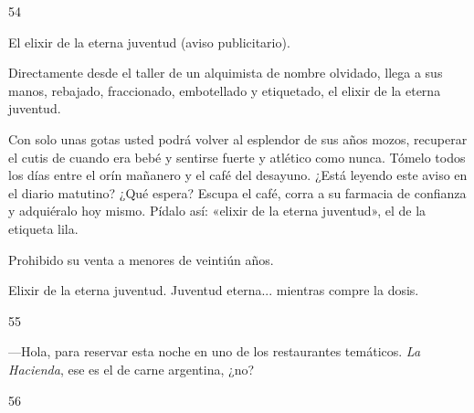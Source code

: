 \documentclass[12pt,twoside,openright,a5paper]{book}
\begin{document}
\vspace{0.5cm}

\hrulefill \hspace{0.1cm}\decofourleft\hspace{0.2cm} 54 \hspace{0.2cm}\decofourright \hspace{0.1cm}\hrulefill

\nopagebreak

\vspace{0.5cm}

\nopagebreak

El elixir de la eterna juventud (aviso publicitario).

Directamente desde el taller de un alquimista de nombre olvidado, llega a
sus manos, rebajado, fraccionado, embotellado y etiquetado, el elixir de
la eterna juventud.

Con solo unas gotas usted podrá volver al esplendor de sus años mozos,
recuperar el cutis de cuando era bebé y sentirse fuerte y atlético
como nunca. Tómelo todos los días entre el orín mañanero y el café
del desayuno.  ¿Está leyendo este aviso en el diario matutino? ¿Qué
espera? Escupa el café, corra a su farmacia de confianza y adquiéralo hoy
mismo. Pídalo así: «elixir de la eterna juventud», el de la etiqueta lila.

Prohibido su venta a menores de veintiún años.

Elixir de la eterna juventud. Juventud eterna... mientras compre la dosis.

\vspace{0.5cm}

\hrulefill \hspace{0.1cm}\decofourleft\hspace{0.2cm} 55 \hspace{0.2cm}\decofourright \hspace{0.1cm}\hrulefill

\nopagebreak

\vspace{0.5cm}

\nopagebreak

---Hola, para reservar esta noche en uno de los restaurantes temáticos. 
\emph{La Hacienda}, ese es el de carne argentina, ¿no?

\vspace{0.5cm}

\hrulefill \hspace{0.1cm}\decofourleft\hspace{0.2cm} 56 \hspace{0.2cm}\decofourright \hspace{0.1cm}\hrulefill
\end{document}

